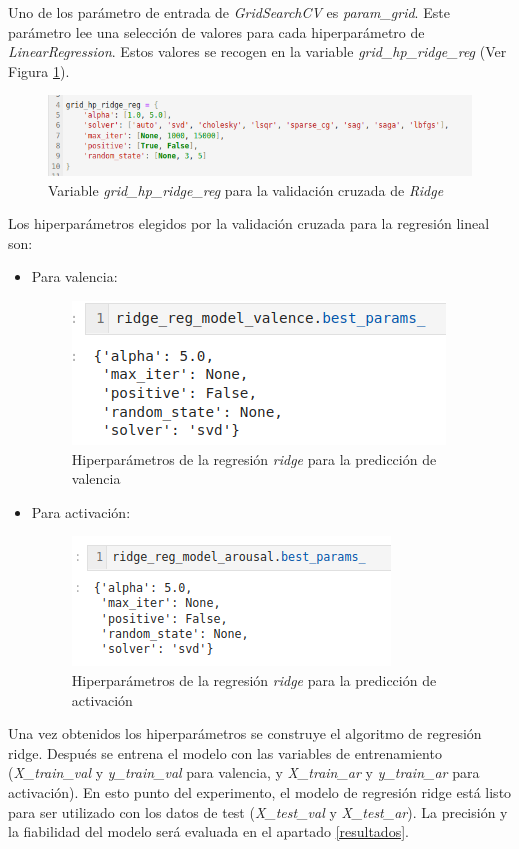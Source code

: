 \documentclass[12pt,a4paper,Spanish]{article}
\begin{document}
Uno de los parámetro de entrada de \textit{GridSearchCV} es \textit{param\_grid}. Este parámetro lee una selección de valores para cada hiperparámetro de \textit{LinearRegression}. Estos valores se recogen en la variable \textit{grid\_hp\_ridge\_reg} (Ver Figura \ref{fig:paramsridge}).
\begin{figure}[H]
	\centering
	\includegraphics[width=0.7\linewidth]{figs/params_ridge}
	\caption{Variable \textit{grid\_hp\_ridge\_reg} para la validación cruzada de \textit{Ridge}}
	\label{fig:paramsridge}
\end{figure}


Los hiperparámetros elegidos por la validación cruzada para la regresión lineal son:
\begin{itemize}
	\item Para valencia:
	\begin{figure}[H]
		\centering
		\includegraphics[width=0.5\linewidth]{figs/final_params_ridge_valence}
		\caption{Hiperparámetros de la regresión \textit{ridge} para la predicción de valencia}
		\label{fig:finalparamsridgevalence}
	\end{figure}
	\item Para activación:
	\begin{figure}[H]
		\centering
		\includegraphics[width=0.5\linewidth]{figs/final_params_ridge_arousal}
		\caption{Hiperparámetros de la regresión \textit{ridge} para la predicción de activación}
		\label{fig:finalparamsridgearousal}
	\end{figure}
	
\end{itemize}
Una vez obtenidos los hiperparámetros se construye el algoritmo de regresión ridge. Después se entrena el modelo con las variables de entrenamiento (\textit{X\_train\_val} y \textit{y\_train\_val} para valencia, y \textit{X\_train\_ar} y \textit{y\_train\_ar} para activación).
\newline
En esto punto del experimento, el modelo de regresión ridge está listo para ser utilizado con los datos de test (\textit{X\_test\_val} y \textit{X\_test\_ar}). La precisión y la fiabilidad del modelo será evaluada en el apartado \ref{resultados}.
\end{document}
